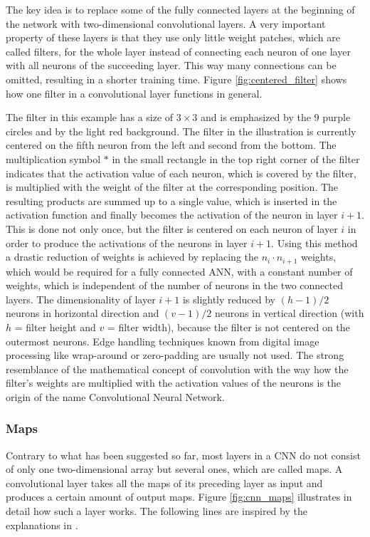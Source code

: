\documentclass[11pt, a4paper]{article}
\begin{document}
The key idea is to replace some of the fully connected layers at the beginning of the network with two-dimensional convolutional layers. A very important property of these layers is that they use only little weight patches, which are called filters, for the whole layer instead of connecting each neuron of one layer with all neurons of the succeeding layer. This way many connections can be omitted, resulting in a shorter training time. Figure \ref{fig:centered_filter} shows how one filter in a convolutional layer functions in general.

The filter in this example has a size of $3\times 3$ and is emphasized by the 9 purple circles and by the light red background. The filter in the illustration is currently centered on the fifth neuron from the left and second from the bottom. The multiplication symbol $*$ in the small rectangle in the top right corner of the filter indicates that the activation value of each neuron, which is covered by the filter, is multiplied with the weight of the filter at the corresponding position. The resulting products are summed up to a single value, which is inserted in the activation function and finally becomes the activation of the neuron in layer $i+1$. This is done not only once, but the filter is centered on each neuron of layer $i$ in order to produce the activations of the neurons in layer $i+1$. Using this method a drastic reduction of weights is achieved by replacing the $n_i \cdot n_{i+1}$ weights, which would be required for a fully connected \ac{ANN}, with a constant number of weights, which is independent of the number of neurons in the two connected layers. The dimensionality of layer $i+1$ is slightly reduced by $(h - 1) / 2$ neurons in horizontal direction and $(v - 1)/2$ neurons in vertical direction (with $h$ = filter height and $v$ = filter width), because the filter is not centered on the outermost neurons. Edge handling techniques known from digital image processing like wrap-around or zero-padding are usually not used. The strong resemblance of the mathematical concept of convolution with the way how the filter's weights are multiplied with the activation values of the neurons is the origin of the name Convolutional Neural Network.

\subsubsection{Maps}
\label{subsubsec:maps}

Contrary to what has been suggested so far, most layers in a \ac{CNN} do not consist of only one two-dimensional array but several ones, which are called maps. A convolutional layer takes all the maps of its preceding layer as input and produces a certain amount of output maps. Figure \ref{fig:cnn_maps} illustrates in detail how such a layer works. The following lines are inspired by the explanations in \cite{gtsrb}.

\end{document}
